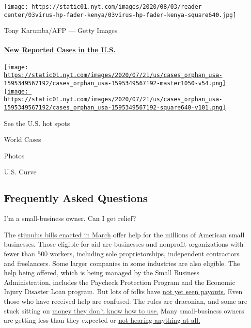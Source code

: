 \texttt{[image: https://static01.nyt.com/images/2020/08/03/reader-center/03virus-hp-fader-kenya/03virus-hp-fader-kenya-square640.jpg]}

 Tony Karumba/AFP --- Getty Images

\hypertarget{new-reported-cases-in-the-us}{%
\paragraph{\texorpdfstring{\href{https://www.nytimes.com/interactive/2020/us/coronavirus-us-cases.html}{New
Reported Cases in the
U.S.}}{New Reported Cases in the U.S.}}\label{new-reported-cases-in-the-us}}

\href{https://www.nytimes.com/interactive/2020/us/coronavirus-us-cases.html}{\texttt{[image: https://static01.nyt.com/images/2020/07/21/us/cases\_orphan\_usa-1595349567192/cases\_orphan\_usa-1595349567192-master1050-v54.png]}
\texttt{[image: https://static01.nyt.com/images/2020/07/21/us/cases\_orphan\_usa-1595349567192/cases\_orphan\_usa-1595349567192-square640-v101.png]}}

See the U.S. hot spots

World Cases

Photos

U.S. Curve

\hypertarget{frequently-asked-questions}{%
\subsection{Frequently Asked
Questions}\label{frequently-asked-questions}}

 I'm a small-business owner. Can I get relief?

The
\href{https://www.nytimes.com/article/small-business-loans-stimulus-grants-freelancers-coronavirus.html}{stimulus
bills enacted in March} offer help for the millions of American small
businesses. Those eligible for aid are businesses and nonprofit
organizations with fewer than 500 workers, including sole
proprietorships, independent contractors and freelancers. Some larger
companies in some industries are also eligible. The help being offered,
which is being managed by the Small Business Administration, includes
the Paycheck Protection Program and the Economic Injury Disaster Loan
program. But lots of folks have
\href{https://www.nytimes.com/interactive/2020/05/07/business/small-business-loans-coronavirus.html}{not
yet seen payouts.} Even those who have received help are confused: The
rules are draconian, and some are stuck sitting on
\href{https://www.nytimes.com/2020/05/02/business/economy/loans-coronavirus-small-business.html}{money
they don't know how to use.} Many small-business owners are getting less
than they expected or
\href{https://www.nytimes.com/2020/06/10/business/Small-business-loans-ppp.html}{not
hearing anything at all.}

